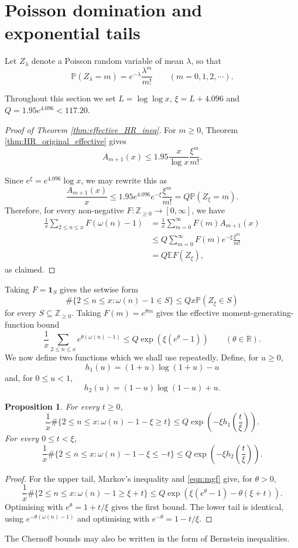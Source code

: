 \documentclass[12pt,a4paper,reqno]{amsart}
\theoremstyle{plain}
\newtheorem{prpstn}[thrm]{Proposition}
\numberwithin{sblmm}{thrm}
\numberwithin{equation}{section}
\begin{document}
\section{Poisson domination and exponential tails}
Let $Z_{\lambda}$ denote a Poisson random variable of mean $\lambda$, so that 
$$\mathbb{P}(Z_{\lambda}=m)=e^{-\lambda}\frac{\lambda^m}{m!} \qquad (m=0,1,2,\cdots).$$

Throughout this section we set $L=\log\log x$, $\xi=L+4.096$ and $Q=1.95e^{4.096}<117.20$.
\begin{proof}[Proof of Theorem \ref{thm:effective_HR_ineq}]
    For $m\ge 0$, Theorem \ref{thm:HR_original_effective} gives
    $$A_{m+1}(x)\le 1.95\frac{x}{\log x}\frac{\xi^m}{m!}.$$

    Since $e^{\xi}=e^{4.096}\log x$, we may rewrite this as
    $$\frac{A_{m+1}(x)}{x}\le 1.95e^{4.096}e^{-\xi}\frac{\xi^m}{m!}=Q\mathbb{P}(Z_{\xi}=m).$$
    Therefore, for every non-negative $F:\mathbb{Z}_{\ge 0}\to [0,\infty]$, we have
    \begin{align*}
        \frac{1}{x}\sum_{2\le n\le x}F(\omega(n)-1)&=\frac{1}{x}\sum_{m=0}^{\infty}F(m)A_{m+1}(x)\\
        &\le Q\sum_{m=0}^{\infty}F(m)e^{-\xi}\frac{\xi^m}{m!}\\
        &=Q\mathbb{E}F(Z_{\xi}),
    \end{align*}
    as claimed.
\end{proof}

Taking $F=\mathbf{1}_S$ gives the setwise form
\begin{equation}\label{eqn:setwise}
 \#\{2\le n\le x:\omega(n)-1\in S\}\le Qx\mathbb{P}(Z_{\xi}\in S)
\end{equation}
for every $S\subseteq\mathbb{Z}_{\ge 0}$. Taking $F(m)=e^{\theta m}$ gives the effective moment-generating-function bound
\begin{equation}\label{eqn:mgf}
    \frac{1}{x}\sum_{2\le n\le x}e^{\theta(\omega(n)-1)}\le Q\exp\left(\xi(e^{\theta}-1)\right) \qquad (\theta\in\mathbb{R}).
\end{equation}
We now define two functions which we shall use repeatedly. Define, for $u\ge 0$,
$$h_1(u)=(1+u)\log(1+u)-u$$
and, for $0\le u<1$,
$$h_2(u)=(1-u)\log(1-u)+u.$$

\begin{prpstn}\label{prop:chernoff}
    For every $t\ge 0$,
    $$\frac{1}{x}\#\{2\le n\le x:\omega(n)-1-\xi\ge t\}\le Q\exp\left(-\xi h_1\left(\frac{t}{\xi}\right)\right).$$
    For every $0\le t<\xi$,
    $$\frac{1}{x}\#\{2\le n\le x:\omega(n)-1-\xi\le -t\}\le Q\exp\left(-\xi h_2\left(\frac{t}{\xi}\right)\right).$$
\end{prpstn}
\begin{proof}
    For the upper tail, Markov's inequality and \eqref{eqn:mgf} give, for $\theta>0$,
    $$\frac{1}{x}\#\{2\le n\le x:\omega(n)-1\ge\xi+t\}\le Q\exp\left(\xi(e^{\theta}-1)-\theta(\xi+t)\right).$$
    Optimising with $e^{\theta}=1+t/\xi$ gives the first bound. The lower tail is identical, using $e^{-\theta(\omega(n)-1)}$ and optimising with $e^{-\theta}=1-t/\xi$.
\end{proof}
The Chernoff bounds may also be written in the form of Bernstein inequalities.
\end{document}
